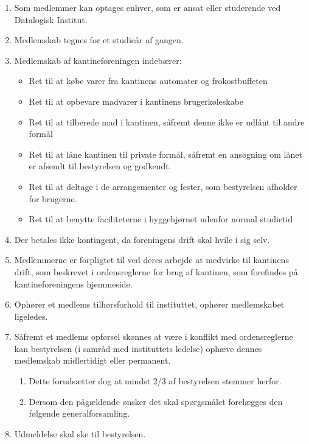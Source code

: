 \documentclass[a4paper, 10pt]{article}
\renewcommand\thesection{\textsection\arabic{section}}
\newenvironment{stykenum}{
  \begin{enumerate}[%
    label=Stk.~\arabic*., ref=\textsection~\theenumi~Stk.~\arabic*, start=1]
}{\end{enumerate}}
\newenvironment{substykenum}{
  \begin{enumerate}[%
          label=Stk.~\arabic{enumi}.\arabic*:,
      ref=\thesection~Stk.~\arabic{enumi}.\arabic*, start=1]
}{\end{enumerate}}
\begin{document}
\begin{stykenum}
\item \label{medlemmer} Som medlemmer kan optages enhver, som er ansat eller
studerende ved Datalogisk Institut. 
    \item Medlemskab tegnes for et studieår
af gangen. 
    \item Medlemskab af kantineforeningen indebærer:

\medskip

\begin{itemize}

\item Ret til at købe varer fra kantinens automater og frokostbuffeten

\item Ret til at opbevare madvarer i kantinens brugerkøleskabe

\item Ret til at tilberede mad i kantinen, såfremt denne ikke er
udlånt til andre formål

\item Ret til at låne kantinen til private formål, såfremt en
ansøgning om lånet er afsendt til bestyrelsen og godkendt.

\item Ret til at deltage i de arrangementer og fester, som bestyrelsen
afholder for brugerne.

\item Ret til at benytte faciliteterne i hyggehjørnet udenfor normal
studietid

\end{itemize}

\item Der betales ikke kontingent, da foreningens drift skal hvile i sig
selv.

\item Med\-lemmerne er forpligtet til ved deres arbejde at medvirke
til kantinens drift, som beskrevet i ordensreglerne for brug af
kantinen, som forefindes på kantineforeningens hjemmeside.  
\item Ophører et
medlems tilhørsforhold til instituttet, ophører medlemskabet
ligeledes.  
\item Såfremt et medlems opførsel skønnes at være i konflikt med
ordensreglerne kan bestyrelsen (i samråd med instituttets le\-delse)
ophæve dennes medlemskab midlertidigt eller permanent. 
    \begin{substykenum}
    \item Dette
    forudsætter dog at mindst 2/3 af bestyrelsen stemmer herfor. 
    \item Dersom
    den pågældende ønsker det skal spørgsmålet forelægges den følgende
    generalforsamling. 
    \end{substykenum}
    \item Udmeldelse skal ske til bestyrelsen.
\end{stykenum}
\end{document}
